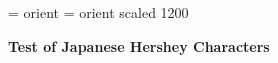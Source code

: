 \font\or    = orient
\font\orbig = orient scaled 1200
\centerline{{\bf Test of Japanese Hershey Characters}}
\vskip 1cm
\centerline{{\or {} }}

\vskip 1cm

\centerline{{\orbig {} }}

\bye

